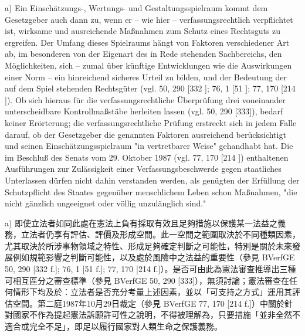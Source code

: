 \documentclass[12pt]{article}
\begin{document}
\begin{sourcepara}[title={原文D.68}]
a) Ein Einschätzungs-, Wertungs- und Gestaltungsspielraum kommt dem Gesetzgeber auch dann zu, wenn er -- wie hier -- verfassungsrechtlich verpflichtet ist, wirksame und ausreichende Maßnahmen zum Schutz eines Rechtsguts zu ergreifen. Der Umfang dieses Spielraums hängt von Faktoren verschiedener Art ab, im besonderen von der Eigenart des in Rede stehenden Sachbereichs, den Möglichkeiten, sich -- zumal über künftige Entwicklungen wie die Auswirkungen einer Norm -- ein hinreichend sicheres Urteil zu bilden, und der Bedeutung der auf dem Spiel stehenden Rechtsgüter (vgl. \abbrBVerfGE{} 50, 290 [332 \abbrF{}]; 76, 1 [51 \abbrF{}]; 77, 170 [214 \abbrF{}]). Ob sich hieraus für die verfassungsrechtliche Überprüfung drei voneinander unterscheidbare Kontrollmaßstäbe herleiten lassen (vgl. \abbrBVerfGE{} 50, 290 [333]), bedarf keiner Erörterung; die verfassungsrechtliche Prüfung erstreckt sich in jedem Falle darauf, ob der Gesetzgeber die genannten Faktoren ausreichend berücksichtigt und seinen Einschätzungsspielraum "in vertretbarer Weise" gehandhabt hat. Die im Beschluß des Senats vom 29. Oktober 1987 (vgl. \abbrBVerfGE{} 77, 170 [214 \abbrF{}]) enthaltenen Ausführungen zur Zulässigkeit einer Verfassungsbeschwerde gegen staatliches Unterlassen dürfen nicht dahin verstanden werden, als genügten der Erfüllung der Schutzpflicht des Staates gegenüber menschlichem Leben schon Maßnahmen, "die nicht gänzlich ungeeignet oder völlig unzulänglich sind."
\end{sourcepara}
\begin{transpara}
a) 即使立法者如同此處在憲法上負有採取有效且足夠措施以保護某一法益之義務，立法者仍享有評估、評價及形成空間。此一空間之範圍取決於不同種類因素，尤其取決於所涉事物領域之特性、形成足夠確定判斷之可能性，特別是關於未來發展例如規範影響之判斷可能性，以及處於風險中之法益的重要性（參見 BVerfGE 50, 290 [332 f.]; 76, 1 [51 f.]; 77, 170 [214 f.]）。是否可由此為憲法審查推導出三種可相互區分之審查標準（參見 BVerfGE 50, 290 [333]），無須討論；憲法審查在任何情形下均及於：立法者是否充分考量上述因素，並以「可支持之方式」運用其評估空間。第二庭1987年10月29日裁定（參見 BVerfGE 77, 170 [214 f.]）中關於針對國家不作為提起憲法訴願許可性之說明，不得被理解為，只要措施「並非全然不適合或完全不足」，即足以履行國家對人類生命之保護義務。
\end{transpara}
\end{document}

